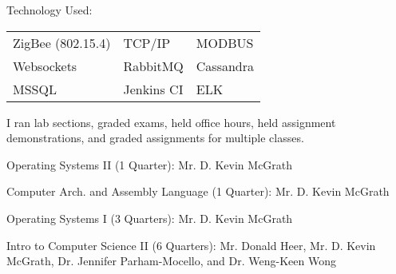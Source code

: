 \documentclass[letterpaper]{deedy-resume} %
\begin{document}
\begin{minipage}[t]{0.66\textwidth}
Technology Used:\\
\begin{tabular}{lll}
ZigBee (802.15.4) & TCP/IP & MODBUS\\
Websockets & RabbitMQ & Cassandra \\
MSSQL & Jenkins CI & ELK\\
\end{tabular}

\sectionspace %



I ran lab sections, graded exams, held office hours, held assignment demonstrations, and graded assignments for multiple classes.
\vspace{\topsep} %
\begin{tightitemize}
\item Operating Systems II (1 Quarter): Mr. D. Kevin McGrath
\item Computer Arch. and Assembly Language (1 Quarter): Mr. D. Kevin McGrath
\item Operating Systems I (3 Quarters): Mr. D. Kevin McGrath
\item Intro to Computer Science II (6 Quarters): Mr. Donald Heer, Mr. D. Kevin McGrath, Dr. Jennifer Parham-Mocello, and  Dr. Weng-Keen Wong
\end{tightitemize}

\sectionspace %







\end{minipage}
\end{document}
